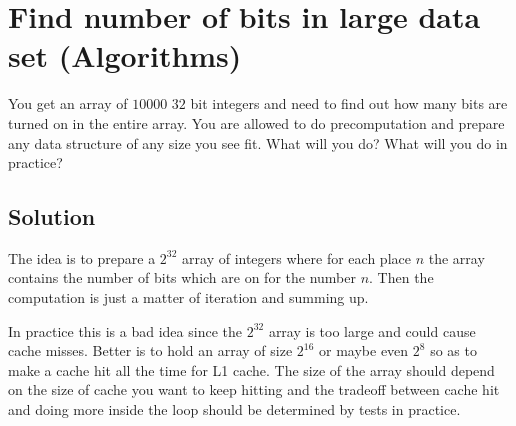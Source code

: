 \section {Find number of bits in large data set (Algorithms)}
You get an array of $10000$ $32$ bit integers and need to find out how many bits are turned on in the entire array.
You are allowed to do precomputation and prepare any data structure of any size you see fit. What will you do? What will you do in practice?

\subsection{Solution}
The idea is to prepare a $2^{32}$ array of integers where for each place $n$ the array contains the number of bits which are on for the number $n$. Then the computation is just a matter of iteration and summing up.

In practice this is a bad idea since the $2^{32}$ array is too large and could cause cache misses. Better is to hold an array of size $2^{16}$ or maybe even $2^{8}$ so as to make a cache hit all the time for L1 cache. The size of the array should depend on the size of cache you want to keep hitting and the tradeoff between cache hit and doing more inside the loop should be determined by tests in practice.
